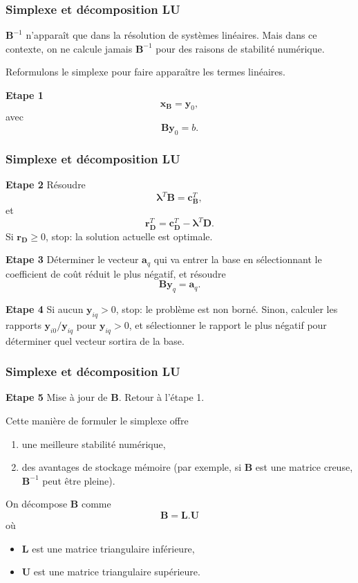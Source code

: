 \documentclass[usepdftitle=false]{beamer}
\def\ba{\boldsymbol{a}}
\def\bc{\boldsymbol{c}}
\def\br{\boldsymbol{r}}
\def\bx{\boldsymbol{x}}
\def\by{\boldsymbol{y}}
\def\bB{\boldsymbol{B}}
\def\bD{\boldsymbol{D}}
\def\bL{\boldsymbol{L}}
\def\bU{\boldsymbol{U}}
\def\blambda{\boldsymbol{\lambda}}
\begin{document}
\begin{frame}
\frametitle{Simplexe et décomposition LU}

$\bB^{-1}$ n'apparaît que dans la résolution de systèmes linéaires. Mais dans ce contexte, on ne calcule jamais $\bB^{-1}$ pour des raisons de stabilité numérique.

\mbox{}

Reformulons le simplexe pour faire apparaître les termes linéaires.

\mbox{}

{\bf Etape 1}
\[
\bx_{\bB} = \by_0,
\]
avec
\[
\bB\by_0 = b.
\]

\end{frame}

\begin{frame}
\frametitle{Simplexe et décomposition LU}

{\bf Etape 2}
Résoudre
\[
\blambda^T \bB = \bc_{\bB}^T,
\]
et
\[
\br_{\bD}^T = \bc_{\bD}^T - \blambda^T \bD.
\]
Si $\br_{\bD} \geq 0$, stop: la solution actuelle est optimale.

\mbox{}

{\bf Etape 3}
Déterminer le vecteur $\ba_q$ qui va entrer la base en sélectionnant le coefficient de coût réduit le plus négatif, et résoudre
\[
\bB \by_q = \ba_q.
\]

\mbox{}

{\bf Etape 4}
Si aucun $\by_{iq} > 0$, stop: le problème est non borné. Sinon, calculer les rapports $\by_{i0}/\by_{iq}$ pour $\by_{iq} > 0$, et sélectionner le rapport le plus négatif pour déterminer quel vecteur sortira de la base.

\end{frame}

\begin{frame}
\frametitle{Simplexe et décomposition LU}

{\bf Etape 5}
Mise à jour de $\bB$. Retour à l'étape 1.

\mbox{}

Cette manière de formuler le simplexe offre
\begin{enumerate}
\item
une meilleure stabilité numérique,
\item
des avantages de stockage mémoire (par exemple, si $\bB$ est une matrice creuse, $\bB^{-1}$ peut être pleine).
\end{enumerate}

\mbox{}

On décompose $\bB$ comme
\[
\bB = \bL.\bU
\]
où
\begin{itemize}
\item
$\bL$ est une matrice triangulaire inférieure,
\item
$\bU$ est une matrice triangulaire supérieure.
\end{itemize}

\end{frame}
\end{document}
